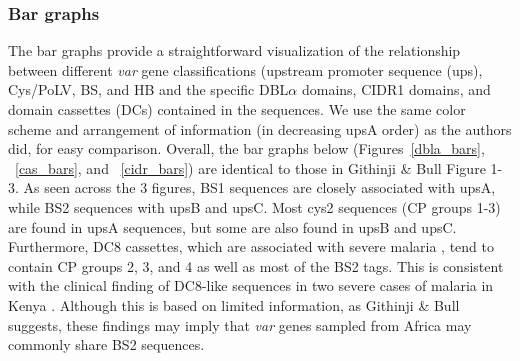 \documentclass[10pt,twocolumn,superscriptaddress]{revtex4-1}
\newcommand{\var}{{\it var}\xspace}
\newcommand{\dbla}{{DBL$\alpha$}\xspace}
\newcommand{\cidra}{{CIDR$\alpha$}\xspace}
\newcommand{\cp}{{Cys/PoLV}\xspace}
\newcommand{\paper}{{Githinji \& Bull}\xspace}
\newcommand{\figdir}{figures/}
\begin{document}
\subsubsection{Bar graphs}
The bar graphs provide a straightforward visualization of the relationship between different \var gene classifications (upstream promoter sequence (ups), \cp, BS, and HB and the specific \dbla domains, CIDR1 domains, and domain cassettes (DCs) contained in the sequences. We use the same color scheme and arrangement of information (in decreasing upsA order) as the authors did, for easy comparison. Overall, the bar graphs below (Figures~\ref{dbla_bars}, ~\ref{cas_bars}, and ~\ref{cidr_bars}) are identical to those in \paper Figure 1-3. As seen across the 3 figures, BS1 sequences are closely associated with upsA, while BS2 sequences with upsB and upsC. Most cys2 sequences (CP groups 1-3) are found in upsA sequences, but some are also found in upsB and upsC. Furthermore, DC8 cassettes, which are associated with severe malaria \cite{lavstsen2012, rask2010}, tend to contain CP groups 2, 3, and 4 as well as most of the BS2 tags. This is consistent with the clinical finding of DC8-like sequences in two severe cases of malaria in Kenya \cite{bull2005}. Although this is based on limited information, as \paper suggests, these findings may imply that \var genes sampled from Africa may commonly share BS2 sequences. 

\end{document}
